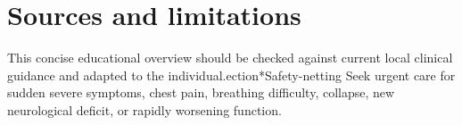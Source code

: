 \section*{Sources and limitations}
This concise educational overview should be checked against current local clinical guidance and adapted to the individual.ection*{Safety-netting}
Seek urgent care for sudden severe symptoms, chest pain, breathing difficulty, collapse, new neurological deficit, or rapidly worsening function.
